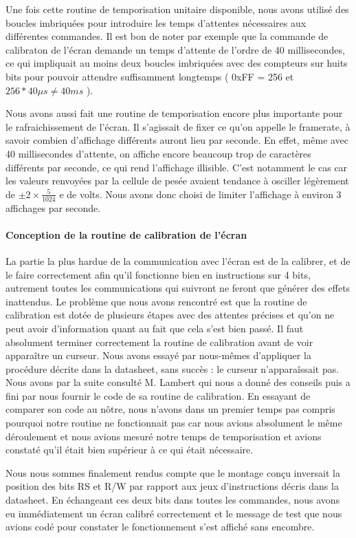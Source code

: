 \documentclass[a4paper,11pt,titlepage]{article}
\begin{document}
Une fois cette routine de temporisation unitaire disponible, nous avons utilisé des boucles imbriquées pour introduire les temps d'attentes nécessaires aux différentes commandes. Il est bon de noter par exemple que la commande de calibraton de l'écran demande un temps d'attente de l'ordre de 40 millisecondes, ce qui impliquait au moins deux boucles imbriquées avec des compteurs sur huits bits pour pouvoir attendre suffisamment longtemps ( 0xFF = 256 et $256 * 40 \mu s  \neq 40 ms$ ).

Nous avons aussi fait une routine de temporisation encore plus importante pour le rafraichissement de l'écran. Il s'agissait de fixer ce qu'on appelle le framerate, à savoir combien d'affichage différents auront lieu par seconde. En effet, même avec 40 millisecondes d'attente, on affiche encore beaucoup trop de caractères différents par seconde, ce qui rend l'affichage illisible. C'est notamment le cas car les valeurs renvoyées par la cellule de pesée avaient tendance à osciller légèrement de $\pm 2 \times \frac{5}{1024}$ e de volts. Nous avons donc choisi de limiter l'affichage à environ 3 affichages par seconde.

\paragraph{Conception de la routine de calibration de l'écran}
La partie la plus hardue de la communication avec l'écran est de la calibrer, et de le faire correctement afin qu'il fonctionne bien en instructions sur 4 bits, autrement toutes les communications qui suivront ne feront que générer des effets inattendus. Le problème que nous avons rencontré est que la routine de calibration est dotée de plusieurs étapes avec des attentes précises et qu'on ne peut avoir d'information quant au fait que cela s'est bien passé. Il faut absolument terminer correctement la routine de calibration avant de voir apparaître un curseur.
Nous avons essayé par nous-mêmes d'appliquer la procédure décrite dans la datasheet, sans succès : le curseur n'apparaîssait pas.
Nous avons par la suite consulté M. Lambert qui nous a donné des conseils puis a fini par nous fournir le code de sa routine de calibration. En essayant de comparer son code au nôtre, nous n'avons dans un premier temps pas compris pourquoi notre routine ne fonctionnait pas car nous avions absolument le même déroulement et nous avions mesuré notre temps de temporisation et avions constaté qu'il était bien supérieur à ce qui était nécessaire.

Nous nous sommes finalement rendus compte que le montage conçu inversait la position des bits RS et R/W par rapport aux jeux d'instructions décris dans la datasheet. En échangeant ces deux bits dans toutes les commandes, nous avons eu immédiatement un écran calibré correctement et le message de test que nous avions codé pour constater le fonctionnement s'est affiché sans encombre.
\end{document}
